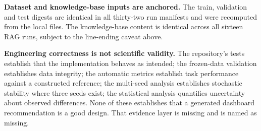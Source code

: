 \textbf{Dataset and knowledge-base inputs are anchored.} The train, validation and test digests are identical in all thirty-two run manifests and were recomputed from the local files. The knowledge-base content is identical across all sixteen RAG runs, subject to the line-ending caveat above.

\textbf{Engineering correctness is not scientific validity.} The repository's tests establish that the implementation behaves as intended; the frozen-data validation establishes data integrity; the automatic metrics establish task performance against a constructed reference; the multi-seed analysis establishes stochastic stability where three seeds exist; the statistical analysis quantifies uncertainty about observed differences. None of these establishes that a generated dashboard recommendation is a good design. That evidence layer is missing and is named as missing.
